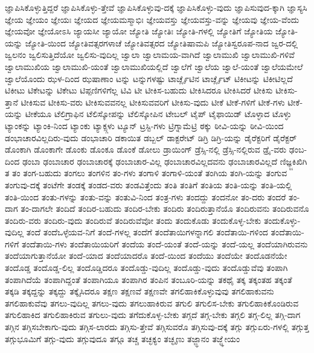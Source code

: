 {ಜ್ಞಾಪಿಸಿಕೊಳ್ಳುತ್ತಿದ್ದರೆ
ಜ್ಞಾಪಿಸಿಕೊಳ್ಳು-ತ್ತೇವೆ
ಜ್ಞಾಪಿಸಿಕೊಳ್ಳುವು-ದಕ್ಕೆ
ಜ್ಞಾಪಿಸಿಕೊಳ್ಳು-ವುದು
ಜ್ಞಾಪಿಸುವುದ-ಕ್ಕಾಗಿ
ಜ್ಞಾಸ್ಯಸಿ
ಜ್ಞೇಯ
ಜ್ಞೇಯಂ
ಜ್ಞೇಯಃ
ಜ್ಞೇಯದ
ಜ್ಞೇಯಮಸ್ಮಾಭಿಃ
ಜ್ಞೇಯವಸ್ತು
ಜ್ಞೇಯವಸ್ತು-ವನ್ನು
ಜ್ಞೇಯವು
ಜ್ಞೇಯ-ವೆಂದು
ಜ್ಞೇಯವೋ
ಜ್ಞೇಯೋಽಸಿ
ಜ್ಯಾಯಸೀ
ಜ್ಯಾಯೋ
ಜ್ಯೋತಿ
ಜ್ಯೋತಿಃ
ಜ್ಯೋತಿ-ಗಳಲ್ಲಿ
ಜ್ಯೋತಿಗೆ
ಜ್ಯೋತಿಯ
ಜ್ಯೋತಿ-ಯನ್ನು
ಜ್ಯೋತಿ-ಯಿಂದ
ಜ್ಯೋತಿವತ್ಸರಗಳಾಚೆ
ಜ್ಯೋತಿವತ್ಸರದ
ಜ್ಯೋತಿಷಾಮಪಿ
ಜ್ಯೋತಿಸ್ವರೂಪ-ನಾದ
ಜ್ವರ-ದಲ್ಲಿ
ಜ್ವಲನಂ
ಜ್ವಲಿಸುತ್ತಿದೆಯೋ
ಜ್ವಲಿಸು-ವುದಿಲ್ಲ
ಜ್ವಾಲಾ
ಜ್ವಾಲಾಮಯ-ವಾಗಿದೆ
ಜ್ವಾಲಾಮುಖಿ
ಜ್ವಾಲಾಮುಖಿ-ಗಳಿವೆ
ಜ್ವಾಲಾಮುಖಿಯ
ಜ್ವಾಲಾಮುಖಿ-ಯಂತೆ
ಜ್ವಾಲಾಮುಖಿಯಲ್ಲಿದೆ
ಜ್ವಾಲೆಗೆ
ಜ್ವಾಲೆಯ
ಜ್ವಾಲೆ-ಯಂತೆ
ಜ್ವಾಲೆಯಮೇಲೆ
ಜ್ವಾಲೆಯೊಂದು
ಝಳ-ದಿಂದ
ಝಷಾಣಾಂ
ಟನ್ನು
ಟನ್ನುಗಳಷ್ಟು
ಟಾರ್ಚ್ಲೈಟಿನ
ಟಾರ್ಚ್ಲೈಟ್
ಟಿಕೀಟನ್ನು
ಟಿಕೀಟಿಲ್ಲದೆ
ಟಿಕೀಟು
ಟಿಕೇಟನ್ನು
ಟಿಕೇಟು
ಟಿಪ್ಪಣಿಗಳಿಗೆಲ್ಲ
ಟಿವಿ
ಟೀ
ಟೀಕಿಸ-ಬಹುದು
ಟೀಕಿಸಿದರೂ
ಟೀಕಿಸಿದರೆ
ಟೀಕಿಸು
ಟೀಕಿಸು-ತ್ತಾನೆ
ಟೀಕಿಸುವ
ಟೀಕಿಸು-ವರು
ಟೀಕಿಸುವವನಲ್ಲ
ಟೀಕಿಸುವವರಿಗೆ
ಟೀಕಿಸು-ವುದು
ಟೀಕೆ
ಟೀಕೆ-ಗಳಿಗೆ
ಟೀಕೆ-ಗಳು
ಟೀಕೆ-ಯನ್ನು
ಟೀಕೆಯೂ
ಟೆಲಿಗ್ರಾಫಿನ
ಟೆಲಿಸ್ಕೋಪನ್ನು
ಟೆಲಿಸ್ಕೋಪಿನ
ಟೇಬಲ್
ಟೈಪ್
ಟೈಫಾಯಿಡ್
ಟೊಳ್ಳಾದ
ಟೊಳ್ಳು
ಟ್ಯಾಂಕನ್ನು
ಟ್ಯಾಂಕಿ-ನಿಂದ
ಟ್ಯಾಂಕು
ಟ್ಯಾಕ್ಸ್ಗಳು
ಟ್ಯೂನ್
ಟ್ರಸ್ಟಿ-ಗಳು
ಟ್ರಿಗ್ನಾಮೆಟ್ರಿ
ಠಕ್ಕು
ಠೀವಿ-ಯನ್ನು
ಠೀವಿ-ಯಿಂದ
ಡಂಭಾಚಾರವಿಲ್ಲದಿರು-ವುದು
ಡಂಭಾಚಾರಿ
ಡಕಾಯಿತ
ಡಬ್ಬಲ್
ಡಾಕ್ಟರೇಟ್
ಡಿಗ್ರಿ
ಡಿಗ್ರಿ-ಯನ್ನು
ಡೈರೆಕ್ಟರಿಗೆ
ಡೈರೆಕ್ಟರ್
ಡೊಂಕಾಗಿ
ಡೊಂಕಾಗೇ
ಡೊಂಕು
ಡೊಂಕೂ
ಡೊಂಕೆ
ಡೋಲು
ಡ್ರಾಯಿಂಗ್
ಡ್ರೆಸ್ಸಿ-ನಲ್ಲಿ
ಡ್ರೆಸ್ಸಿ-ನಲ್ಲಿರುವ
ಡ್ರೈ-ವರು
ಢಂಬ-ದಿಂದ
ಢಂಬಾ
ಢಂಬಾಚಾರ
ಢಂಬಾಚಾರಕ್ಕೆ
ಢಂಬಾಚಾರ-ವಿಲ್ಲ
ಢಂಬಾಚಾರವಿಲ್ಲದವನು
ಢಂಬಾಚಾರವಿಲ್ಲದೆ
ಣಿಜ್ಞ್ಜಕಿಖಿಗಿ
ತ
ತಂ
ತಂಗ-ಬಹುದು
ತಂಗಲು
ತಂಗಳಿನ
ತಂ-ಗಳು
ತಂಗಾಳಿ
ತಂಗಾಳಿ-ಯಂತೆ
ತಂಗಿಯ
ತಂಗಿ-ಯನ್ನು
ತಂಗುವ
ತಂಗುವು-ದಕ್ಕೆ
ತಂಟೆಗೇ
ತಂಡಕ್ಕೆ
ತಂಡದ-ವರು
ತಂಡವಿತ್ತೆಂದು
ತಂತಿ
ತಂತಿಗೆ
ತಂತಿಯ
ತಂತಿ-ಯನ್ನು
ತಂತಿ-ಯಲ್ಲಿ
ತಂತಿ-ಯಿಂದ
ತಂತು-ಗಳನ್ನು
ತಂತು-ವನ್ನು
ತಂತುವಿ-ನಿಂದ
ತಂತ್ರ-ಗಳು
ತಂದದ್ದು
ತಂದನೋ
ತಂ-ದರು
ತಂದರೆ
ತಂ-ದಾಗ
ತಂ-ದಾಗಲೇ
ತಂದಿದೆ
ತಂದಿರ-ಬಹುದು
ತಂದಿರ-ಬೇಕು
ತಂದಿರು
ತಂದಿರುತ್ತಾನೆಯೊ
ತಂದಿರುವನು
ತಂದಿರುವನೊ
ತಂದಿರು-ವರು
ತಂದಿರು-ವುದು
ತಂದಿರುವೆ
ತಂದಿರುವೆವೋ
ತಂದು
ತಂದುಕೊಡು
ತಂದುಕೊಳ್ಳ-ಬೇಕು
ತಂದುಕೊಳ್ಳು-ವುದಿಲ್ಲ
ತಂದೆ
ತಂದೆಒಳ್ಳೆಯವ-ನಿಗೆ
ತಂದೆ-ಗಳಲ್ಲ
ತಂದೆಗೆ
ತಂದೆತಾಯಿಗಳನ್ನಾಗಲಿ
ತಂದೆತಾಯಿ-ಗಳಿಂದ
ತಂದೆತಾಯಿ-ಗಳಿಗೆ
ತಂದೆತಾಯಿ-ಗಳು
ತಂದೆತಾಯಿಯರಿಗೆ
ತಂದೆಯ
ತಂದೆ-ಯಂತೆ
ತಂದೆ-ಯನ್ನು
ತಂದೆ-ಯಲ್ಲ
ತಂದೆಯಾಗಿರುವನು
ತಂದೆಯಾಗುತ್ತಾನೆಯೋ
ತಂದೆ-ಯಾದ
ತಂದೆಯಾದರೊ
ತಂದೆ-ಯಿಂದ
ತಂದೆಯು
ತಂದೆಯೇ
ತಂದೊಡನೆಯೇ
ತಂದೊಡ್ಡ
ತಂದೊಡ್ಡ-ಲಿಲ್ಲ
ತಂದೊಡ್ಡಿದರೂ
ತಂದೊಡ್ಡು-ವುದಿಲ್ಲ
ತಂದೊಡ್ಡು-ವುದು
ತಂದೊಡ್ಡುವೆವು
ತಂಪಾಗಿ
ತಂಪಾಗಿದೆಯೆ
ತಂಪಾಗಿದ್ದಂತೆ
ತಂಪಾಗಿಯೂ
ತಂಪಾಗಿರ
ತಂಪಿನ
ತಂಬೂರಿ-ಯನ್ನು
ತಕಥೈ
ತಕ್ಕ
ತಕ್ಕಂತಹ
ತಕ್ಕಂತೆ
ತಕ್ಕಡಿ
ತಕ್ಕದ್ದನ್ನು
ತಕ್ಕದ್ದು
ತಕ್ಕೈಸಿದರೂ
ತಕ್ಷಣ
ತಕ್ಷಣವೆ
ತಕ್ಷಣವೇ
ತಗಲಿಹಾಕಿಕೊಳ್ಳುವುವು
ತಗಲಿಹಾಕುವನು
ತಗಲಿಹಾಕುವೆವು
ತಗಲು-ವುದಿಲ್ಲ
ತಗಲು-ವುದು
ತಗಲುಹಾಕಿರುವ
ತಗುಲಿ
ತಗುಲಿಸ-ಬೇಕು
ತಗುಲಿಹಾಕಿಕೊಂಡಿರುವ
ತಗುಲಿಹಾಕಿದ
ತಗುಲಿಹಾಕಿರುವ
ತಗುಲು-ವುದು
ತಗೆದುಕೊಳ್ಳ-ಬೇಕು
ತಗ್ಗದೆ
ತಗ್ಗ-ಬೇಕು
ತಗ್ಗಲಿ
ತಗ್ಗ-ಲಿಲ್ಲ
ತಗ್ಗಿ-ದಾಗ
ತಗ್ಗಿನ
ತಗ್ಗಿಸಬೇಕಾಗು-ವುದು
ತಗ್ಗಿಸ-ಲಾರದು
ತಗ್ಗಿಸು-ತ್ತೇವೆ
ತಗ್ಗಿಸುವರೊ
ತಗ್ಗಿಸುವು-ದಕ್ಕೆ
ತಗ್ಗು
ತಗ್ಗುಏರು-ಗಳಲ್ಲಿ
ತಗ್ಗುತ್ತ
ತಗ್ಗುಭೂಮಿಗೆ
ತಗ್ಗು-ವುದು
ತಗ್ಗುವುದೂ
ತಗ್ಗೂ
ತಚ್ಚ
ತಚ್ಛಕ್ಯಂ
ತಚ್ಛೃಣು
ತಜ್ಜ್ಞಾನಂ
ತಜ್ಜ್ಞೇಯಂ
}
